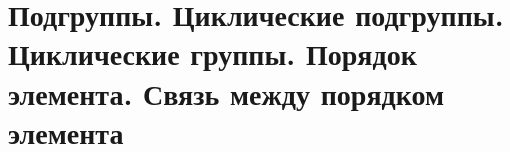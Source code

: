 \section{Подгруппы. Циклические подгруппы. Циклические группы. Порядок элемента. Связь между порядком элемента}
